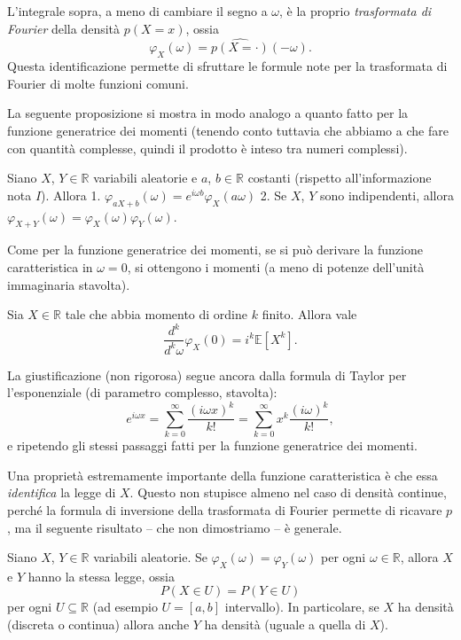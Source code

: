 \documentclass[
  italian,
  letterpaper,
]{book}
\newcommand{\sqa}[1]{\left[ #1 \right]}
\newcommand{\R}{\mathbb{R}}
\newcommand{\E}[1]{\mathbb{E}\sqa{#1}}
\theoremstyle{definition}
\theoremstyle{remark}
\begin{document}
L'integrale sopra, a meno di cambiare il segno a \(\omega\), è la
proprio \emph{trasformata di Fourier} della densità \(p(X=x)\), ossia
\[ \varphi_X(\omega) = \widehat{p(X=\cdot)} (-\omega).\] Questa
identificazione permette di sfruttare le formule note per la trasformata
di Fourier di molte funzioni comuni.

La seguente proposizione si mostra in modo analogo a quanto fatto per la
funzione generatrice dei momenti (tenendo conto tuttavia che abbiamo a
che fare con quantità complesse, quindi il prodotto è inteso tra numeri
complessi).

Siano \(X\), \(Y \in \R\) variabili aleatorie e \(a\), \(b\in \R\)
costanti (rispetto all'informazione nota \(I\)). Allora 1.
\(\varphi_{aX+b}(\omega)= e^{i \omega b} \varphi_{X}(a\omega)\) 2. Se
\(X\), \(Y\) sono indipendenti, allora
\(\varphi_{X+Y}(\omega) = \varphi_{X}(\omega)\varphi_{Y}(\omega)\).

Come per la funzione generatrice dei momenti, se si può derivare la
funzione caratteristica in \(\omega =0\), si ottengono i momenti (a meno
di potenze dell'unità immaginaria stavolta).

Sia \(X \in \R\) tale che abbia momento di ordine \(k\) finito. Allora
vale \[ \frac{d^k}{d^k \omega} \varphi_X(0) = i^k \E{X^k}.\]

La giustificazione (non rigorosa) segue ancora dalla formula di Taylor
per l'esponenziale (di parametro complesso, stavolta):
\[ e^{ i \omega x} = \sum_{k=0}^\infty \frac{(i \omega x)^k}{k!} = \sum_{k=0}^\infty x^k \frac{(i\omega)^k}{k!} 
 ,\] e ripetendo gli stessi passaggi fatti per la funzione generatrice
dei momenti.

Una proprietà estremamente importante della funzione caratteristica è
che essa \emph{identifica} la legge di \(X\). Questo non stupisce almeno
nel caso di densità continue, perché la formula di inversione della
trasformata di Fourier permette di ricavare \(p\), ma il seguente
risultato -- che non dimostriamo -- è generale.

\protect{}\label{iniettivita-fourier}
Siano \(X\), \(Y \in \R\) variabili aleatorie. Se
\(\varphi_X(\omega)= \varphi_Y(\omega)\) per ogni \(\omega \in \R\),
allora \(X\) e \(Y\) hanno la stessa legge, ossia
\[ P( X \in U)  = P( Y \in U)\] per ogni \(U \subseteq  \R\) (ad esempio
\(U = [a,b]\) intervallo). In particolare, se \(X\) ha densità (discreta
o continua) allora anche \(Y\) ha densità (uguale a quella di \(X\)).
\end{document}

